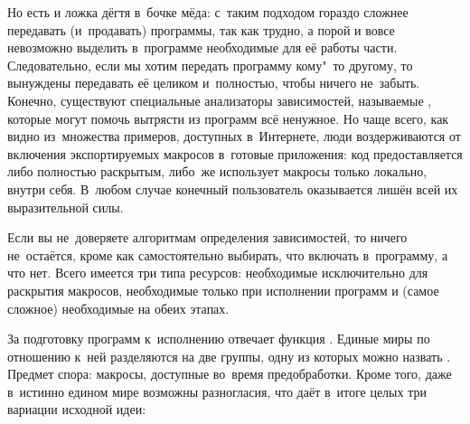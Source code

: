 Но есть и ложка дёгтя в~бочке мёда: с~таким подходом гораздо сложнее передавать
(и~продавать) программы, так как трудно, а порой и вовсе невозможно выделить
в~программе необходимые для её работы части. Следовательно, если мы хотим
передать программу кому"~то другому, то вынуждены передавать её целиком
и~полностью, чтобы ничего не~забыть. Конечно, существуют специальные анализаторы
зависимостей, называемые , которые могут помочь вытрясти из
программ всё ненужное. Но чаще всего, как видно из~множества примеров, доступных
в~Интернете, люди воздерживаются от включения экспортируемых макросов в~готовые
приложения: код предоставляется либо полностью раскрытым, либо~же использует
макросы только локально, внутри себя. В~любом случае конечный пользователь
оказывается лишён всей их выразительной силы.

Если вы не~доверяете алгоритмам определения зависимостей, то ничего не~остаётся,
кроме как самостоятельно выбирать, что включать в~программу, а что нет. Всего
имеется три типа ресурсов: необходимые исключительно для раскрытия макросов,
необходимые только при исполнении программ и (самое сложное) необходимые на
обеих этапах.

За подготовку программ к~исполнению отвечает функция . Единые
миры по отношению к~ней разделяются на две группы, одну из которых можно назвать
. Предмет спора: макросы, доступные
 во~время предобработки. Кроме того, даже в~истинно едином мире
возможны разногласия, что даёт в~итоге целых три вариации исходной идеи:

